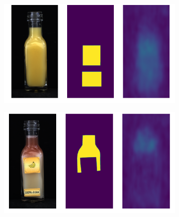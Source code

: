 \begin{figure}[htbp]
    \captionsetup[subfigure]{justification=centering}
    \centering
    \begin{subfigure}[b]{0.3\textwidth}
        \centering
        \includegraphics[width=\textwidth]{figures/locosimplenetresults/JB/image_prediction_105.png}

    \end{subfigure}
    \begin{subfigure}[b]{0.3\textwidth}
        \centering

    \end{subfigure}
    \begin{subfigure}[b]{0.3\textwidth}
        \centering

    \end{subfigure}
    \begin{subfigure}[b]{0.3\textwidth}
        \centering
        \includegraphics[width=\textwidth]{figures/locosimplenetresults/JB/image_prediction_286.png}


\end{subfigure}
\end{figure}
